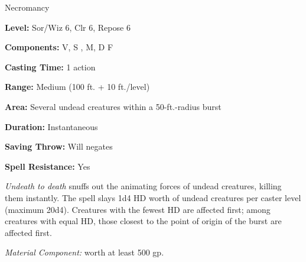 
Necromancy

\textbf{Level:} Sor/Wiz 6, Clr 6, Repose 6

\textbf{Components:} V, S , M, D F

\textbf{Casting Time:} 1 action

\textbf{Range:} Medium (100 ft. + 10 ft./level)

\textbf{Area:} Several undead creatures within a 50-ft.-radius burst

\textbf{Duration:} Instantaneous

\textbf{Saving Throw:} Will negates

\textbf{Spell Resistance:} Yes

\textit{Undeath to death} snuffs out the animating forces of undead creatures, 
killing them instantly. The spell slays 1d4 HD worth of undead creatures per caster 
level (maximum 20d4). Creatures with the fewest HD are affected first; among creatures 
with equal HD, those closest to the point of origin of the burst are affected first.

\textit{Material Component:} worth at least 500 gp.
